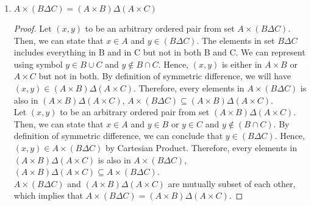 \documentclass[12pt]{article}
\begin{document}
\begin{enumerate}
\begin{enumerate}
\begin{proof}
			 $A \times (B - C)$ and $ (A\times B) - (A\times C)$ are mutually subset of each other, which implies that $A \times (B - C) =  (A\times B) - (A\times C)$.
		
					\end{proof}
		
		
		\item $A \times (B \Delta C) = (A\times B) \Delta (A\times C)$ \\
		\begin{proof}
				Let $(x,y)$ to be an arbitrary ordered pair from set $A \times (B \Delta C)$. Then, we can state that $x \in A$ and $y \in (B \Delta C)$. The elements in set $B \Delta C$ includes everything in B and in C but not in both B and C. We can represent using symbol $ y 
				\in B \cup C$ and $y \notin B \cap C$. Hence, $(x,y)$ is either in $A \times B$ or $ A\times C$ but not in both. By definition of symmetric difference, we will have $(x,y) \in  (A\times B) \Delta (A\times C)$. Therefore, every elements in $A \times (B \Delta C) $ is also in $ (A\times B) \Delta (A\times C)$, $ A \times (B \Delta C) \subseteq  (A\times B) \Delta (A\times C)$.\\
				
				Let $(x,y)$ to be an arbitrary ordered pair from set $(A\times B) \Delta (A\times C)$. Then, we can state that $x \in A$ and $y \in B$ or $y \in C$ and $y \notin (B \cap C)$. By definition of symmetric difference, we can conclude that $y \in (B \Delta C)$. Hence, $(x,y) \in A \times (B \Delta C)$ by Cartesian Product. Therefore, every elements in $ (A\times B) \Delta (A\times C)$ is also in $ A \times (B \Delta C) $, $  (A\times B) \Delta (A\times C) \subseteq  A \times (B \Delta C) $.\\
				
				 $A \times (B \Delta C)$ and $ (A\times B) \Delta (A\times C)$ are mutually subset of each other, which implies that $A \times (B \Delta C) = (A\times B) \Delta (A\times C)$.
		\end{proof}
	\end{enumerate}
\end{enumerate}
\end{document}
